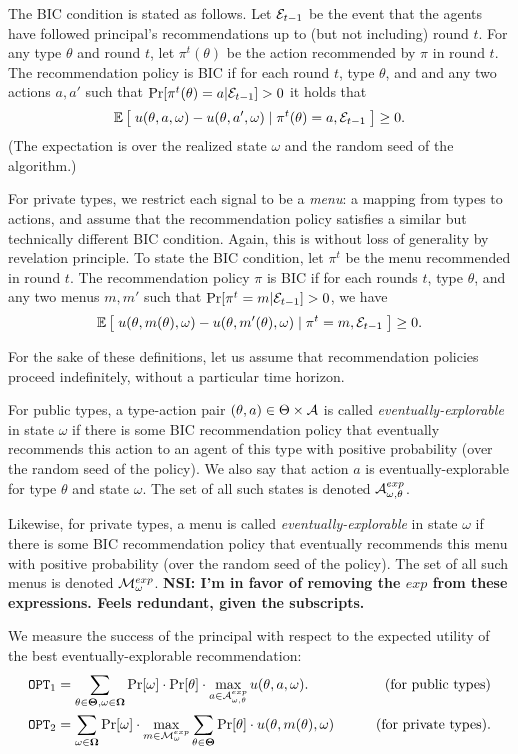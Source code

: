 The BIC condition is stated as follows. Let $\mathcal{E}_{t-1}$ be the event that the agents have followed principal's recommendations up to (but not including) round $t$. For any type $\theta$ and round $t$, let $\pi^t(\theta)$ be the action recommended by $\pi$ in round $t$. The recommendation policy is BIC if for each round $t$, type $\theta$, and and any two actions $a,a'$ such that $\Pr[\pi^t(\theta) = a|\mathcal{E}_{t-1}] > 0$ it holds that
\[
\mathbb{E}\left[\; u(\theta,a,\omega) - u(\theta,a',\omega) \mid \pi^t(\theta) =a, \mathcal{E}_{t-1}\;\right] \geq 0.
\]
(The expectation is over the realized state $\omega$ and the random seed of the algorithm.)

For private types, we restrict each signal to be a \emph{menu}: a mapping from types to actions, and assume that the recommendation policy satisfies a similar but technically different BIC condition. Again, this is without loss of generality by revelation principle. To state the BIC condition, let $\pi^t$ be the menu recommended in round $t$. The recommendation policy $\pi$ is BIC if for each rounds $t$, type $\theta$, and any two menus $m,m'$ such that 
    $\Pr[\pi^t= m|\mathcal{E}_{t-1}] > 0$, we have
\[
\mathbb{E}\left[\; u(\theta,m(\theta),\omega) - u(\theta,m'(\theta),\omega) 
    \mid \pi^t = m, \mathcal{E}_{t-1}\;\right] \geq 0.
\]
 
For the sake of these definitions, let us assume that recommendation policies proceed indefinitely, \ie without a particular time horizon. 

For public types, a type-action pair $(\theta,a)\in \Theta\times \mathcal{A}$ is called \emph{eventually-explorable} in state $\omega$ if there is some BIC recommendation policy that eventually recommends this action to an agent of this type with positive probability (over the random seed of the policy). We also say that action $a$ is eventually-explorable for type $\theta$ and state $\omega$. The set of all such states is denoted $\mathcal{A}_{\omega,\theta}^{exp}$.


Likewise, for private types, a menu is called \emph{eventually-explorable} in state $\omega$ if there is some BIC recommendation policy that eventually recommends this menu with positive probability (over the random seed of the policy). The set of all such menus is denoted $\mathcal{M}_{\omega}^{exp}$. {\bf NSI: I'm in favor of removing the $exp$ from these expressions.  Feels redundant, given the subscripts.}

We measure the success of the principal with respect to the expected utility of the best eventually-explorable recommendation:
\begin{align*}
\mathtt{OPT}_1 &= \sum_{\theta \in \bold{\Theta}, \omega\in \bold{\Omega}} \Pr[\omega] \cdot \Pr[\theta] \cdot \max_{a \in \mathcal{A}_{\omega,\theta}^{exp}} u(\theta, a, \omega).
    &\qquad\text{(for public types)}\\
\mathtt{OPT}_2 &= \sum_{\omega\in \bold{\Omega}} \Pr[\omega] \cdot\max_{m \in \mathcal{M}_{\omega}^{exp}}\sum_{\theta \in \bold{\Theta}} \Pr[\theta] \cdot  u(\theta, m(\theta), \omega)
&\qquad\text{(for private types)}.
\end{align*}

